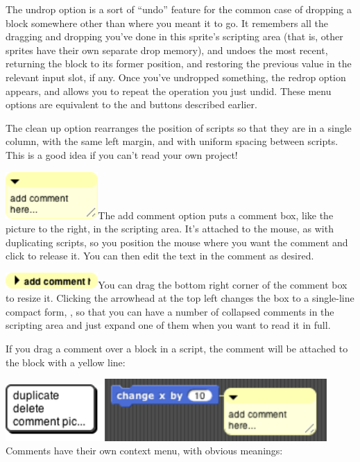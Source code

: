 The undrop option is a sort of ``undo'' feature for the common case of
dropping a block somewhere other than where you meant it to go. It
remembers all the dragging and dropping you've done in this sprite's
scripting area (that is, other sprites have their own separate drop
memory), and undoes the most recent, returning the block to its former
position, and restoring the previous value in the relevant input slot,
if any. Once you've undropped something, the redrop option appears, and
allows you to repeat the operation you just undid. These menu options
are equivalent to the and buttons described earlier.

The clean up option rearranges the position of scripts so that they are
in a single column, with the same left margin, and with uniform spacing
between scripts. This is a good idea if you can't read your own project!

\includegraphics[width=1.38889in,height=0.70833in]{media/image1078.png}The
add comment option puts a comment box, like the picture to the right, in
the scripting area. It's attached to the mouse, as with duplicating
scripts, so you position the mouse where you want the comment and click
to release it. You can then edit the text in the comment as desired.

\includegraphics[width=1.38889in,height=0.23611in]{media/image1079.png}You
can drag the bottom right corner of the comment box to resize it.
Clicking the arrowhead at the top left changes the box to a single-line
compact form, , so that you can have a number of collapsed comments in
the scripting area and just expand one of them when you want to read it
in full.

If you drag a comment over a block in a script, the comment will be
attached to the block with a yellow line:

\includegraphics[width=1.48611in,height=0.84722in]{media/image1080.png}\includegraphics[width=3.33333in,height=0.93333in]{media/image1081.png}Comments
have their own context menu, with obvious meanings:

